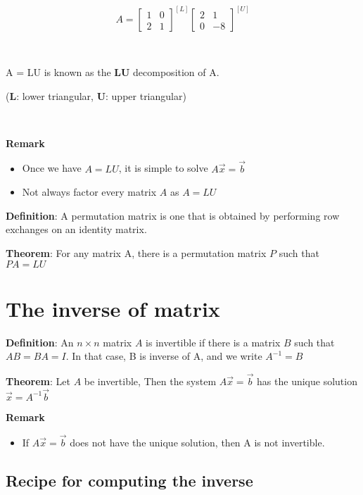 \documentclass{article}
\begin{document}
\[
A=
\begin{bmatrix}
    1 & 0 \\
    2 & 1
\end{bmatrix}^{[L]}
\begin{bmatrix}
    2 & 1 \\
    0 & -8
\end{bmatrix}^{[U]}
\]
{\

A = LU is known as the\textbf{ LU }decomposition of A. 

(\textbf{L}: lower triangular, \textbf{U}: upper triangular)

}

{\

\textbf{Remark}

\begin{itemize}
    \item Once we have $A = LU$, it is simple to solve $A\vec{x}=\vec{b}$
    \item Not always factor every matrix $A$ as $A=LU$
\end{itemize}

\textbf{Definition}: A permutation matrix is one that is obtained by performing row exchanges on an identity matrix.

\textbf{Theorem}: For any matrix A, there is a permutation matrix $P$ such that $PA=LU$

}

\section{The inverse of matrix}

{


\textbf{Definition}: 
An $n \times n$ matrix $A$ is invertible if there is a matrix $B$ such that $AB=BA=I$. 
In that case, B is inverse of A, and we write $A^{-1}=B$

\textbf{Theorem}: Let $A$ be invertible, Then the system  $A\vec{x}=\vec{b}$ has the unique solution 
 $\vec{x}=A^{-1}\vec{b}$
 
 
\textbf{Remark}

\begin{itemize}
    \item If $A\vec{x}=\vec{b}$ does not have the unique solution, then A is not invertible.
\end{itemize}

}
\subsection{Recipe for computing the inverse}
\end{document}
